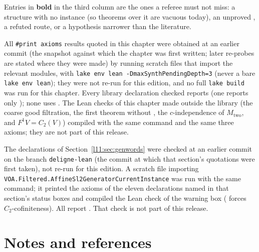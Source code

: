 \endgroup

Entries in \textbf{bold} in the third column are the ones a referee must not miss: a structure with no instance (so theorems
over it are vacuous today), an unproved , a refuted route, or a hypothesis narrower than the literature.

All \texttt{\#print axioms} results quoted in this chapter were obtained at an earlier commit (the snapshot
against which the chapter was first written; later re-probes are stated where they were made) by running scratch files that
import the relevant modules, with \texttt{lake env lean -DmaxSynthPendingDepth=3} (never a bare \texttt{lake env lean}); they were
not re-run for this edition, and no full \texttt{lake build} was run for this chapter. Every library declaration checked reports \lean{[propext, Classical.}\allowbreak{}\allowbreak\lean{sound]} (one reports only ); none uses . The Lean checks of this chapter made outside the library (the coarse good
filtration, the first theorem without , the $c$-independence of $M_{\mathrm{two}}$, and $F^1V = C_2(V)$) compiled with the
same command and the same three axioms; they are not part of this release.

The declarations of Section~\ref{l11:sec:genwords} were checked at an earlier commit on the branch \texttt{deligne-lean}
(the commit at which that section's quotations were first taken), not re-run for this edition. A scratch file
importing \texttt{VOA.\allowbreak Filtered.\allowbreak AffineSl2GeneratorCurrentInstance} was run with the same command; it
printed the axioms of the eleven declarations named in that section's status boxes and compiled the Lean
check of the warning box ( forces $C_2$-cofiniteness). All report \lean{[propext, Classical.}\allowbreak{}\allowbreak\lean{sound]}. That check is not part of this release.

\section{Notes and references}\label{l11:sec:notes}

